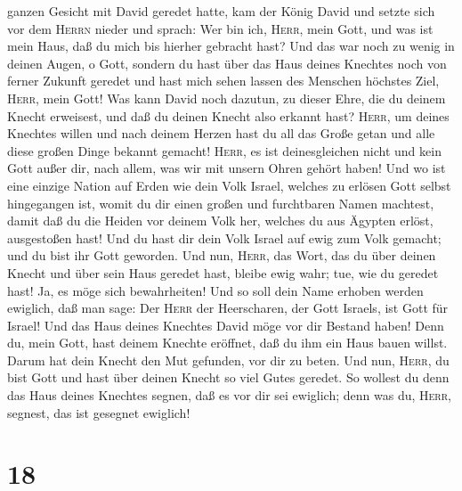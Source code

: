 ganzen Gesicht mit David geredet hatte,  kam der König
David und setzte sich vor dem \textsc{Herrn} nieder und sprach: Wer bin
ich, \textsc{Herr}, mein Gott, und was ist mein Haus, daß du mich bis
hierher gebracht hast?  Und das war noch zu wenig in
deinen Augen, o Gott, sondern du hast über das Haus deines Knechtes noch
von ferner Zukunft geredet und hast mich sehen lassen des Menschen
höchstes Ziel, \textsc{Herr}, mein Gott!  Was kann David
noch dazutun, zu dieser Ehre, die du deinem Knecht erweisest, und daß du
deinen Knecht also erkannt hast?  \textsc{Herr}, um
deines Knechtes willen und nach deinem Herzen hast du all das Große
getan und alle diese großen Dinge bekannt gemacht! 
\textsc{Herr}, es ist deinesgleichen nicht und kein Gott außer dir, nach
allem, was wir mit unsern Ohren gehört haben!  Und wo ist
eine einzige Nation auf Erden wie dein Volk Israel, welches zu erlösen
Gott selbst hingegangen ist, womit du dir einen großen und furchtbaren
Namen machtest, damit daß du die Heiden vor deinem Volk her, welches du
aus Ägypten erlöst, ausgestoßen hast!  Und du hast dir
dein Volk Israel auf ewig zum Volk gemacht; und du bist ihr Gott
geworden.  Und nun, \textsc{Herr}, das Wort, das du über
deinen Knecht und über sein Haus geredet hast, bleibe ewig wahr; tue,
wie du geredet hast!  Ja, es möge sich bewahrheiten! Und
so soll dein Name erhoben werden ewiglich, daß man sage: Der
\textsc{Herr} der Heerscharen, der Gott Israels, ist Gott für Israel!
Und das Haus deines Knechtes David möge vor dir Bestand haben!
 Denn du, mein Gott, hast deinem Knechte eröffnet, daß du
ihm ein Haus bauen willst. Darum hat dein Knecht den Mut gefunden, vor
dir zu beten.  Und nun, \textsc{Herr}, du bist Gott und
hast über deinen Knecht so viel Gutes geredet.  So
wollest du denn das Haus deines Knechtes segnen, daß es vor dir sei
ewiglich; denn was du, \textsc{Herr}, segnest, das ist gesegnet
ewiglich!

\hypertarget{section-17}{%
\section{18}\label{section-17}}

